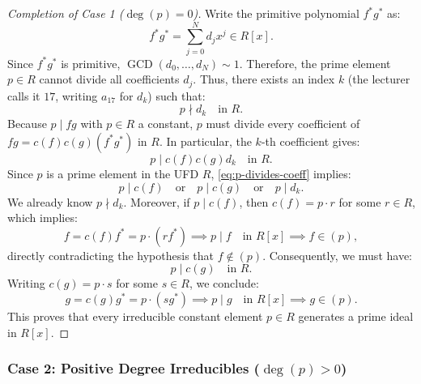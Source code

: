 \begin{proofWrapper}
\begin{content}
\begin{proof}[Completion of Case 1 ($\deg(p) = 0$)]
Write the primitive polynomial $f^* g^*$ as:
\[
f^* g^* = \sum_{j=0}^N d_j x^j \in R[x].
\]
Since $f^* g^*$ is primitive, $\operatorname{GCD}(d_0, \dots, d_N) \sim 1$. Therefore, the prime element $p \in R$ cannot divide all coefficients $d_j$. Thus, there exists an index $k$ (the lecturer calls it $17$, writing $a_{17}$ for $d_k$) such that:
\[
p \nmid d_k \quad \text{in } R.
\]
Because $p \mid fg$ with $p \in R$ a constant, $p$ must divide every coefficient of $fg = c(f) c(g) (f^* g^*)$ in $R$. In particular, the $k$-th coefficient gives:
\begin{equation}\label{eq:p-divides-coeff}
p \mid c(f) c(g) d_k \quad \text{in } R.
\end{equation}
Since $p$ is a prime element in the UFD $R$, \eqref{eq:p-divides-coeff} implies:
\[
p \mid c(f) \quad \text{or} \quad p \mid c(g) \quad \text{or} \quad p \mid d_k.
\]
We already know $p \nmid d_k$. Moreover, if $p \mid c(f)$, then $c(f) = p \cdot r$ for some $r \in R$, which implies:
\[
f = c(f) f^* = p \cdot (r f^*) \implies p \mid f \quad \text{in } R[x] \implies f \in (p),
\]
directly contradicting the hypothesis that $f \notin (p)$.
Consequently, we must have:
\[
p \mid c(g) \quad \text{in } R.
\]
Writing $c(g) = p \cdot s$ for some $s \in R$, we conclude:
\[
g = c(g) g^* = p \cdot (s g^*) \implies p \mid g \quad \text{in } R[x] \implies g \in (p).
\]
This proves that every irreducible constant element $p \in R$ generates a prime ideal in $R[x]$.
\end{proof}
\end{content}

\begin{hidden}
\end{hidden}

\subsubsection{Case 2: Positive Degree Irreducibles (\texorpdfstring{$\deg(p) > 0$}{deg(p) > 0})}


\end{proofWrapper}
